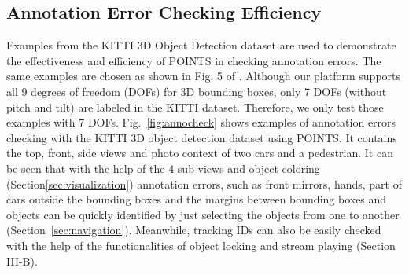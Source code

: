 \documentclass[letterpaper, 10 pt, conference]{ieeeconf}  %
\begin{document}
\subsection{Annotation Error Checking Efficiency}
\label {sec:errcheck}
Examples from the KITTI 3D Object Detection dataset \cite{Geiger2012CVPR} are used to demonstrate the effectiveness and efficiency of POINTS in checking annotation errors. 
The same examples are chosen as shown in Fig. 5 of \cite{pointatme}. 
Although our platform supports all 9 degrees of freedom (DOFs) for 3D bounding boxes, only 7 DOFs (without pitch and tilt) are labeled in the KITTI dataset.
Therefore, we only test those examples with 7 DOFs.
Fig.~\ref{fig:annocheck} shows examples of annotation errors checking with the KITTI 3D object detection dataset using POINTS. 
It contains the top, front, side views and photo context of two cars and a pedestrian.
It can be seen that with the help of the 4 sub-views and object coloring (Section\ref{sec:visualization}) 
annotation errors, such as front mirrors, hands, part of cars outside the bounding boxes and the margins between bounding boxes and objects
can be quickly identified by just selecting the objects from one to another (Section~\ref{sec:navigation}).
Meanwhile, tracking IDs can also be easily checked with the help of the functionalities of object locking and stream playing (Section III-B).
\end{document}
